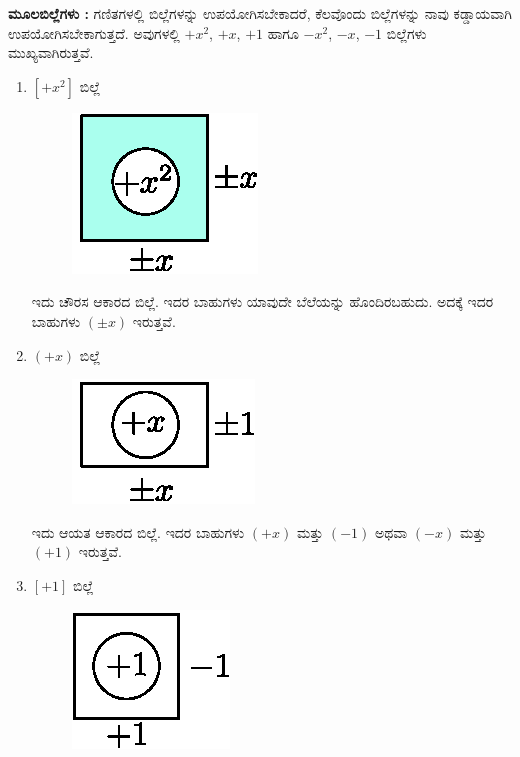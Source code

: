 \noindent
{\textbf{ಮೂಲಬಿಲ್ಲೆಗಳು :}} ಗಣಿತಗಳಲ್ಲಿ ಬಿಲ್ಲೆಗಳನ್ನು ಉಪಯೋಗಿಸಬೇಕಾದರೆ, ಕೆಲವೊಂದು ಬಿಲ್ಲೆಗಳನ್ನು ನಾವು ಕಡ್ಡಾಯವಾಗಿ ಉಪಯೋಗಿಸಬೇಕಾಗುತ್ತದೆ. ಅವುಗಳಲ್ಲಿ  $+x^2$, $+x$, $+1$ ಹಾಗೂ $-x^{2}$, $-x$, $-1$  ಬಿಲ್ಲೆಗಳು ಮುಖ್ಯವಾಗಿರುತ್ತವೆ. 

\eject

\begin{enumerate}
\item $[+x^2]$ ಬಿಲ್ಲೆ 
\begin{figure}[H]
\centering
\includegraphics[scale=0.8]{src/figure/chap3/fig3-4a.eps}
\end{figure}

ಇದು ಚೌರಸ ಆಕಾರದ ಬಿಲ್ಲೆ. ಇದರ ಬಾಹುಗಳು ಯಾವುದೇ ಬೆಲೆಯನ್ನು ಹೊಂದಿರಬಹುದು. ಅದಕ್ಕೆ ಇದರ ಬಾಹುಗಳು $(\pm x)$ ಇರುತ್ತವೆ.

\item $(+x)$ ಬಿಲ್ಲೆ 
\begin{figure}[H]
\centering
\includegraphics[scale=0.8]{src/figure/chap3/fig3-4b.eps}
\end{figure}

ಇದು ಆಯತ ಆಕಾರದ ಬಿಲ್ಲೆ. ಇದರ ಬಾಹುಗಳು $(+x)$ ಮತ್ತು $(-1)$ ಅಥವಾ $(-x)$ ಮತ್ತು $(+1)$ ಇರುತ್ತವೆ.

\item $[+1]$ ಬಿಲ್ಲೆ 
\begin{figure}[H]
\centering
\includegraphics[scale=0.8]{src/figure/chap3/fig3-4c.eps}
\end{figure}


\end{enumerate}
